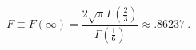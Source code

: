 \begin{equation}
F\equiv F(\infty)= \frac{2\sqrt \pi\Gamma(\frac{2}{3})}{\Gamma 
(\frac{1}{6})}
\approx .86237\ .
\end{equation}

